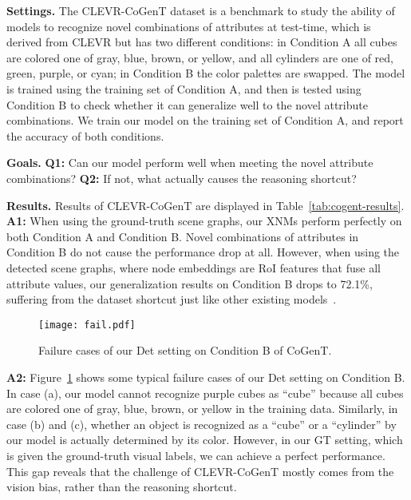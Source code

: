 \documentclass[10pt,twocolumn,letterpaper]{article}
\begin{document}
\textbf{Settings.}
The CLEVR-CoGenT dataset is a benchmark to study the ability of models to recognize novel combinations of attributes at test-time, which is derived from CLEVR but has two different conditions:
in Condition A all cubes are colored one of gray, blue, brown, or yellow, and all cylinders are one of red, green, purple, or cyan; in Condition B the color palettes are swapped.
The model is trained using the training set of Condition A, and then is tested using Condition B to check whether it can generalize well to the novel attribute combinations.
We train our model on the training set of Condition A, and report the accuracy of both conditions.

\textbf{Goals.}
\textbf{Q1:}
Can our model perform well when meeting the novel attribute combinations? 
\textbf{Q2:}
If not, what actually causes the reasoning shortcut?




\textbf{Results.}
Results of CLEVR-CoGenT are displayed in Table~\ref{tab:cogent-results}.
\textbf{A1:}
When using the ground-truth scene graphs, our XNMs perform perfectly on both Condition A and Condition B.
Novel combinations of attributes in Condition B do not cause the performance drop at all.
However, when using the detected scene graphs, where node embeddings are RoI features that fuse all attribute values, our generalization results on Condition B drops to 72.1\%, suffering from the dataset shortcut just like other existing models~\cite{johnson2017inferring,mascharka2018transparency}.


\begin{figure}[H]
\texttt{[image: fail.pdf]}
\caption{Failure cases of our Det setting on Condition B of CoGenT.}
\label{fig:fail}
\vspace{-0.2cm}
\end{figure}


\textbf{A2:}
Figure~\ref{fig:fail} shows some typical failure cases of our Det setting on Condition B.
In case (a), our model cannot recognize purple cubes as ``cube'' because all cubes are colored one of gray, blue, brown, or yellow in the training data.
Similarly, in case (b) and (c), whether an object is recognized as a ``cube'' or a ``cylinder'' by our model is actually determined by its color.
However, in our GT setting, which is given the ground-truth visual labels, we can achieve a perfect performance.
This gap reveals that the challenge of CLEVR-CoGenT mostly comes from the vision bias, rather than the reasoning shortcut.
\end{document}
